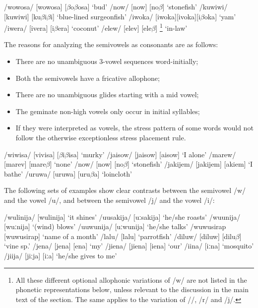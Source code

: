 \ea 
\ea
/wowosa/  [wo{{\textprimstress}wosa}] {\Tilde} [$\beta $o{{\textprimstress}$\beta $osa}]  `bud'
\ex
/now/  [now] {\Tilde} [no$\beta $]  `stonefish'
\ex
/kuwiwi/  [ku{{\textprimstress}wiwi}] {\Tilde} [ku{{\textprimstress}$\beta $i$\beta $i}]  `blue-lined surgeonfish'
\ex
/iwoka/  [i{{\textprimstress}woka}]{\Tilde}[i{{\textprimstress}voka}]{\Tilde}[i{{\textprimstress}$\beta $oka}]  `yam'
\ex
/iwera/  [i{{\textprimstress}vera}] {\Tilde} [i{{\textprimstress}$\beta $era}]  `coconut'
\ex
/elew/  [e{{\textprimstress}lev}] {\Tilde} [e{{\textprimstress}le$\beta $}] \footnote{All these different optional allophonic variations of /w/ are not listed in the phonetic representations below, unless relevant to the discussion in the main text of the section. The same applies to the variation of /{\textphi}/, /r/ and /j/.}  `in-law'
\z
\z


The reasons for analyzing the semivowels as consonants are as follows:


\begin{itemize}
\item There are no unambiguous 3-vowel sequences word-initially; 
\item Both the semivowels have a fricative allophone;
\item There are no unambiguous glides starting with a mid vowel; 
\item The geminate non-high vowels only occur in initial syllables;
\item If they were interpreted as vowels, the stress pattern of some words would not follow the otherwise exceptionless stress placement rule.
\end{itemize}

\ea
\ea
/wiwisa/  [vi{{\textprimstress}visa}] {\Tilde} [$\beta $i{{\textprimstress}$\beta $isa}]  `murky'
\ex
/jaisow/  [{{\textprimstress}jaisow}] {\Tilde} [{{\textprimstress}}{\textyogh}aisow]  `I alone'
\ex
/marew/  [ma{{\textprimstress}rev}] {\Tilde} [ma{{\textprimstress}}re$\beta $]  `none'
\ex
/now/  [now] {\Tilde} [no$\beta $]  `stonefish'
\ex
/jakijem/  [ja{{\textprimstress}kijem}] {\Tilde} [{\textyogh}a{{\textprimstress}}ki{\textyogh}em]  `I bathe'
\ex
/uruwa/  [u{{\textprimstress}ruwa}] {\Tilde} [u{{\textprimstress}}ru$\beta $a]  `loincloth'
\z
\z

The following sets of examples show clear contrasts between the semivowel /w/ and the vowel /u/, and between the semivowel /j/ and the vowel /i/:

\ea 
\ea
/wulinija/  [wu{{\textprimstress}linija}]  `it shines'
\ex
/uusakija/  [{{\textprimstress}uːsakija}]  `he/she roasts'
\ex
/wuunija/  [{{\textprimstress}wuːnija}]  `(wind) blows'
\ex
/uuwunija/  [{{\textprimstress}uːwunija}]  `he/she talks'
\ex
/wuwusirap  [wu{{\textprimstress}wusirap}]  `name of a month'
\ex
/lalu/  [la{{\textprimstress}lu}]  `parrotfish'
\ex
/diluw/  [di{{\textprimstress}luw}] {\Tilde} [di{{\textprimstress}lu$\beta $}]  `vine sp.'
\ex
/jena/  [je{{\textprimstress}na}] {\Tilde} [{\textyogh}e{{\textprimstress}na}]  `my'
\ex
/jiena/  [ji{{\textprimstress}ena}] {\Tilde} [{\textyogh}i{{\textprimstress}ena}]  `our'
\ex
/iina/  [{{\textprimstress}iːna}]  `mosquito'
\ex
/jiija/  [{{\textprimstress}jiːja}] {\Tilde} [{{\textprimstress}}{\textyogh}iː{\textyogh}a]  `he/she gives to me'
\z
\z

